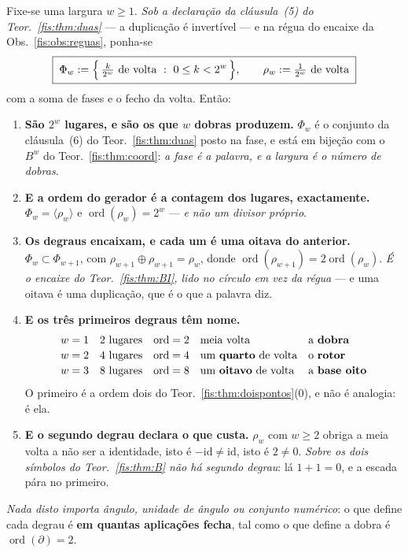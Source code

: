 \documentclass[livro.tex]{subfiles}
\begin{document}
\begin{teorema}\label{fis:thm:largura}
Fixe-se uma largura $w\ge1$. \emph{Sob a declaração da cláusula~(5) do
Teor.~\ref{fis:thm:duas}} --- a duplicação é invertível --- e na régua do
encaixe da Obs.~\ref{fis:obs:reguas}, ponha-se
\[
\boxed{\;\Phi_w:=\Bigl\{\,\tfrac{k}{2^{w}}\ \text{de volta}\ :\ 0\le k<2^{w}\,\Bigr\},
\qquad \rho_w:=\tfrac{1}{2^{w}}\ \text{de volta}\;}
\]
com a soma de fases e o fecho da volta. Então:
\begin{enumerate}\itemsep3pt
\item[(1)] \textbf{São $2^{w}$ lugares, e são os que $w$ dobras produzem.}
$\Phi_w$ é o conjunto da cláusula~(6) do Teor.~\ref{fis:thm:duas} posto na fase,
e está em bijeção com o $B^{w}$ do Teor.~\ref{fis:thm:coord}: \emph{a fase é a
palavra, e a largura é o número de dobras.}
\item[(2)] \textbf{E a ordem do gerador é a contagem dos lugares, exactamente.}
$\Phi_w=\langle\rho_w\rangle$ e $\operatorname{ord}(\rho_w)=2^{w}$ ---
\emph{e não um divisor próprio}.
\item[(3)] \textbf{Os degraus encaixam, e cada um é uma \textbf{oitava} do
anterior.} $\Phi_w\subset\Phi_{w+1}$, com $\rho_{w+1}\oplus\rho_{w+1}=\rho_w$,
donde $\operatorname{ord}(\rho_{w+1})=2\operatorname{ord}(\rho_w)$. \emph{É o
encaixe do Teor.~\ref{fis:thm:BI}, lido no círculo em vez da régua} --- e uma
oitava é uma duplicação, que é o que a palavra diz.
\item[(4)] \textbf{E os três primeiros degraus têm nome.}
\[
\begin{array}{cllll}
w=1 & 2\ \text{lugares} & \operatorname{ord}=2 & \text{meia volta} & \text{a \textbf{dobra}}\\[2pt]
w=2 & 4\ \text{lugares} & \operatorname{ord}=4 & \text{um \textbf{quarto} de volta} & \text{o \textbf{rotor}}\\[2pt]
w=3 & 8\ \text{lugares} & \operatorname{ord}=8 & \text{um \textbf{oitavo} de volta} & \text{a \textbf{base oito}}
\end{array}
\]
O primeiro é a ordem dois do Teor.~\ref{fis:thm:doispontos}(0), e não é analogia: é ela.
\item[(5)] \textbf{E o segundo degrau declara o que custa.} $\rho_w$ com
$w\ge2$ obriga a meia volta a não ser a identidade, isto é
$-\mathrm{id}\neq\mathrm{id}$, isto é $2\neq0$. \emph{Sobre os dois símbolos do
Teor.~\ref{fis:thm:B} não há segundo degrau}: lá $1+1=0$, e a escada pára no
primeiro.
\end{enumerate}
\emph{Nada disto importa ângulo, unidade de ângulo ou conjunto numérico}: o que
define cada degrau é \textbf{em quantas aplicações fecha}, tal como o que define
a dobra é $\operatorname{ord}(\partial)=2$.
\end{teorema}
\end{document}
